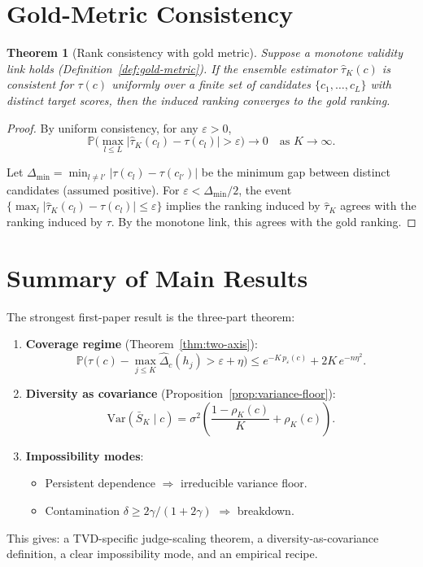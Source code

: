 \documentclass[11pt]{article}
\newtheorem{theorem}{Theorem}[section]
\newcommand{\Prob}{\mathbb{P}}
\begin{document}
\section{Gold-Metric Consistency}
\label{sec:gold}

\begin{theorem}[Rank consistency with gold metric]
\label{thm:gold-consistency}
Suppose a monotone validity link holds (Definition~\ref{def:gold-metric}).
If the ensemble estimator $\hat\tau_K(c)$ is consistent for $\tau(c)$
uniformly over a finite set of candidates $\{c_1, \ldots, c_L\}$ with distinct target scores, then
the induced ranking converges to the gold ranking.
\end{theorem}

\begin{proof}
By uniform consistency, for any $\varepsilon > 0$,
\begin{equation}
\Prob\!\Big(\max_{l \le L} |\hat\tau_K(c_l) - \tau(c_l)| > \varepsilon\Big) \to 0
\quad\text{as } K \to \infty.
\end{equation}

Let $\Delta_{\min} = \min_{l \neq l'} |\tau(c_l) - \tau(c_{l'})|$ be the
minimum gap between distinct candidates (assumed positive). For
$\varepsilon < \Delta_{\min}/2$, the event
$\{\max_l |\hat\tau_K(c_l) - \tau(c_l)| \le \varepsilon\}$ implies
the ranking induced by $\hat\tau_K$ agrees with the ranking induced by
$\tau$. By the monotone link, this agrees with the gold ranking.
\end{proof}

\section{Summary of Main Results}
\label{sec:summary}

The strongest first-paper result is the three-part theorem:

\begin{enumerate}
\item \textbf{Coverage regime} (Theorem~\ref{thm:two-axis}):
\[
\Prob\!\Big(\tau(c) - \max_{j \le K} \widehat\Delta_c(h_j)
> \varepsilon + \eta\Big)
\le e^{-K \, p_\varepsilon(c)} + 2K \, e^{-n\eta^2}.
\]

\item \textbf{Diversity as covariance} (Proposition~\ref{prop:variance-floor}):
\[
\mathrm{Var}(\bar S_K \mid c)
= \sigma^2\!\left(\frac{1 - \rho_K(c)}{K} + \rho_K(c)\right).
\]

\item \textbf{Impossibility modes}:
\begin{itemize}
\item Persistent dependence $\Rightarrow$ irreducible variance floor.
\item Contamination $\delta \ge 2\gamma/(1+2\gamma)$ $\Rightarrow$ breakdown.
\end{itemize}
\end{enumerate}

This gives: a TVD-specific judge-scaling theorem, a diversity-as-covariance
definition, a clear impossibility mode, and an empirical recipe.
\end{document}
